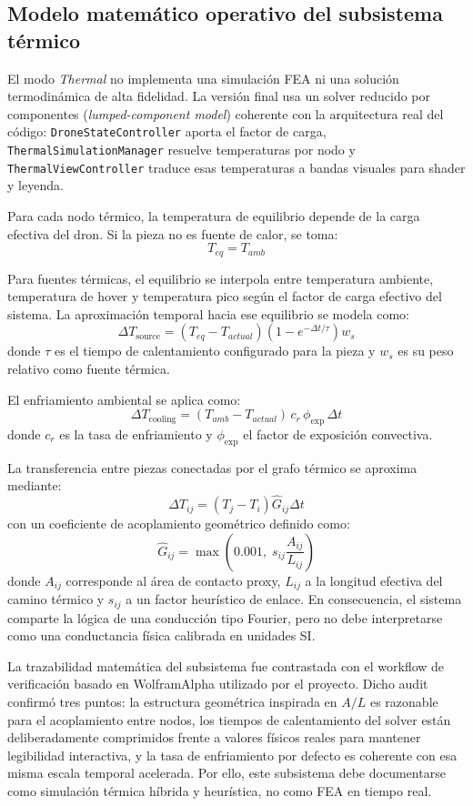 \subsection{Modelo matemático operativo del subsistema térmico}

El modo \textit{Thermal} no implementa una simulación FEA ni una solución termodinámica de alta fidelidad. La versión final usa un solver reducido por componentes (\textit{lumped-component model}) coherente con la arquitectura real del código: \texttt{DroneStateController} aporta el factor de carga, \texttt{ThermalSimulationManager} resuelve temperaturas por nodo y \texttt{ThermalViewController} traduce esas temperaturas a bandas visuales para shader y leyenda.

Para cada nodo térmico, la temperatura de equilibrio depende de la carga efectiva del dron. Si la pieza no es fuente de calor, se toma:
\[
T_{eq} = T_{amb}
\]

Para fuentes térmicas, el equilibrio se interpola entre temperatura ambiente, temperatura de hover y temperatura pico según el factor de carga efectivo del sistema. La aproximación temporal hacia ese equilibrio se modela como:
\[
\Delta T_{\text{source}} = \left(T_{eq} - T_{actual}\right)\left(1 - e^{-\Delta t / \tau}\right)w_s
\]
donde $\tau$ es el tiempo de calentamiento configurado para la pieza y $w_s$ es su peso relativo como fuente térmica.

El enfriamiento ambiental se aplica como:
\[
\Delta T_{\text{cooling}} = \left(T_{amb} - T_{actual}\right)\, c_r \, \phi_{\text{exp}} \, \Delta t
\]
donde $c_r$ es la tasa de enfriamiento y $\phi_{\text{exp}}$ el factor de exposición convectiva.

La transferencia entre piezas conectadas por el grafo térmico se aproxima mediante:
\[
\Delta T_{ij} = \left(T_j - T_i\right)\hat{G}_{ij}\Delta t
\]
con un coeficiente de acoplamiento geométrico definido como:
\[
\hat{G}_{ij} = \max\left(0.001,\; s_{ij}\frac{A_{ij}}{L_{ij}}\right)
\]
donde $A_{ij}$ corresponde al área de contacto proxy, $L_{ij}$ a la longitud efectiva del camino térmico y $s_{ij}$ a un factor heurístico de enlace. En consecuencia, el sistema comparte la lógica de una conducción tipo Fourier, pero no debe interpretarse como una conductancia física calibrada en unidades SI.

La trazabilidad matemática del subsistema fue contrastada con el workflow de verificación basado en WolframAlpha utilizado por el proyecto. Dicho audit confirmó tres puntos: la estructura geométrica inspirada en $A/L$ es razonable para el acoplamiento entre nodos, los tiempos de calentamiento del solver están deliberadamente comprimidos frente a valores físicos reales para mantener legibilidad interactiva, y la tasa de enfriamiento por defecto es coherente con esa misma escala temporal acelerada. Por ello, este subsistema debe documentarse como simulación térmica híbrida y heurística, no como FEA en tiempo real.

